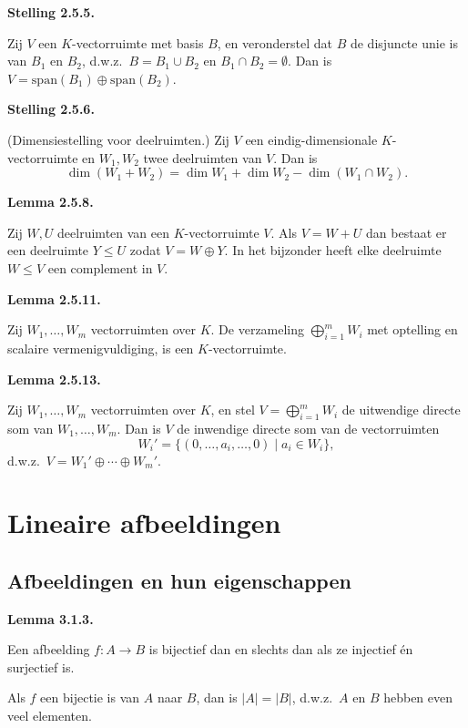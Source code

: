 \documentclass[10pt,a4paper]{article}
\newenvironment{res}[2]{%
  \par\noindent\textbf{#1 #2.}%
}{%
  \par\vspace{2pt}\normalfont
}
\begin{document}
\begin{res}{Stelling}{2.5.5}
Zij $V$ een $K$-vectorruimte met basis $B$, en veronderstel dat $B$ de disjuncte unie is van $B_1$ en $B_2$, d.w.z.\ $B=B_1\cup B_2$ en $B_1\cap B_2=\emptyset$. Dan is $V=\mathrm{span}(B_1)\oplus\mathrm{span}(B_2)$.
\end{res}

\begin{res}{Stelling}{2.5.6}
\textup{(Dimensiestelling voor deelruimten.)} Zij $V$ een eindig-dimensionale $K$-vectorruimte en $W_1,W_2$ twee deelruimten van $V$. Dan is
\[
\dim(W_1+W_2)=\dim W_1+\dim W_2-\dim(W_1\cap W_2).
\]
\end{res}

\begin{res}{Lemma}{2.5.8}
Zij $W,U$ deelruimten van een $K$-vectorruimte $V$. Als $V=W+U$ dan bestaat er een deelruimte $Y\le U$ zodat $V=W\oplus Y$. In het bijzonder heeft elke deelruimte $W\le V$ een complement in $V$.
\end{res}

\begin{res}{Lemma}{2.5.11}
Zij $W_1,\dots,W_m$ vectorruimten over $K$. De verzameling $\bigoplus_{i=1}^m W_i$ met optelling en scalaire vermenigvuldiging, is een $K$-vectorruimte.
\end{res}

\begin{res}{Lemma}{2.5.13}
Zij $W_1,\dots,W_m$ vectorruimten over $K$, en stel $V=\bigoplus_{i=1}^m W_i$ de uitwendige directe som van $W_1,\dots,W_m$. Dan is $V$ de inwendige directe som van de vectorruimten
\[
W_i' = \{(0,\dots,a_i,\dots,0)\mid a_i\in W_i\},
\]
d.w.z.\ $V=W_1'\oplus\cdots\oplus W_m'$.
\end{res}

\section{Lineaire afbeeldingen}

\subsection{Afbeeldingen en hun eigenschappen}
\begin{res}{Lemma}{3.1.3}
\begin{myenum}
\item Een afbeelding $f:A\to B$ is bijectief dan en slechts dan als ze injectief \'en surjectief is.
\item Als $f$ een bijectie is van $A$ naar $B$, dan is $|A|=|B|$, d.w.z.\ $A$ en $B$ hebben even veel elementen.
\end{myenum}
\end{res}
\end{document}

